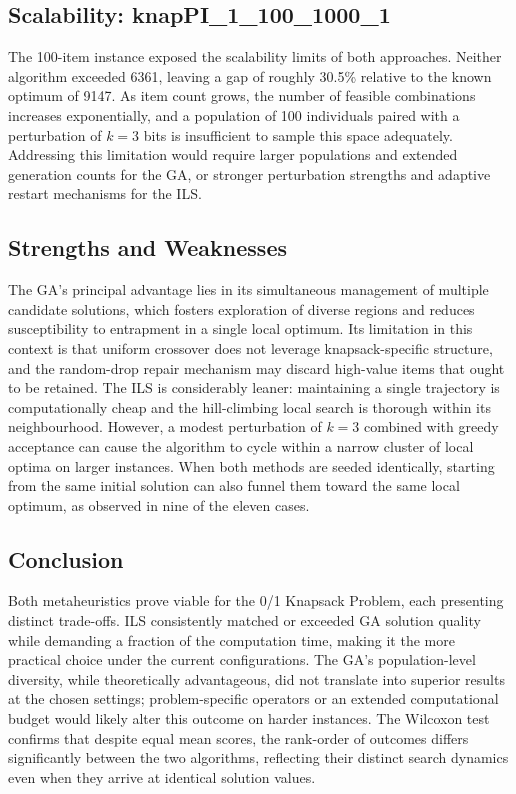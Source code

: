 \documentclass[12pt, a4paper]{article}
\begin{document}
\subsection{Scalability: knapPI\_1\_100\_1000\_1}

The 100-item instance exposed the scalability limits of both approaches. Neither algorithm exceeded 6361, leaving a gap of roughly 30.5\% relative to the known optimum of 9147. As item count grows, the number of feasible combinations increases exponentially, and a population of 100 individuals paired with a perturbation of $k = 3$ bits is insufficient to sample this space adequately. Addressing this limitation would require larger populations and extended generation counts for the GA, or stronger perturbation strengths and adaptive restart mechanisms for the ILS.

\subsection{Strengths and Weaknesses}

The GA's principal advantage lies in its simultaneous management of multiple candidate solutions, which fosters exploration of diverse regions and reduces susceptibility to entrapment in a single local optimum. Its limitation in this context is that uniform crossover does not leverage knapsack-specific structure, and the random-drop repair mechanism may discard high-value items that ought to be retained. The ILS is considerably leaner: maintaining a single trajectory is computationally cheap and the hill-climbing local search is thorough within its neighbourhood. However, a modest perturbation of $k = 3$ combined with greedy acceptance can cause the algorithm to cycle within a narrow cluster of local optima on larger instances. When both methods are seeded identically, starting from the same initial solution can also funnel them toward the same local optimum, as observed in nine of the eleven cases.

\subsection{Conclusion}

Both metaheuristics prove viable for the 0/1 Knapsack Problem, each presenting distinct trade-offs. ILS consistently matched or exceeded GA solution quality while demanding a fraction of the computation time, making it the more practical choice under the current configurations. The GA's population-level diversity, while theoretically advantageous, did not translate into superior results at the chosen settings; problem-specific operators or an extended computational budget would likely alter this outcome on harder instances. The Wilcoxon test confirms that despite equal mean scores, the rank-order of outcomes differs significantly between the two algorithms, reflecting their distinct search dynamics even when they arrive at identical solution values.
\end{document}
